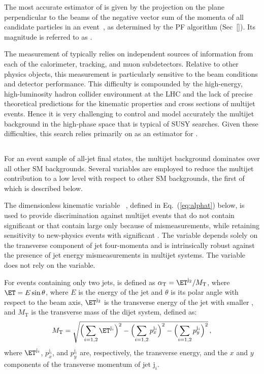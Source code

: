 The most accurate estimator of \ptvecmiss is given by the projection
on the plane perpendicular to the beams of the negative vector sum of
the momenta of all candidate particles in an event~\cite{cms-met}, as
determined by the PF algorithm (Sec~\ref{}). Its magnitude is referred
to as \ETmiss.

The measurement of \met typically relies on independent sources of
information from each of the calorimeter, tracking, and muon
subdetectors. Relative to other physics objects, this measurement is
particularly sensitive to the beam conditions and detector
performance. This difficulty is compounded by the high-energy,
high-luminosity hadron collider environment at the LHC and the lack of
precise theoretical predictions for the kinematic properties and cross
sections of multijet events. Hence it is very challenging to control
and model accurately the multijet background in the high-\met phase
space that is typical of SUSY searches. Given these difficulties, this
search relies primarily on \HTmiss as an estimator for \ptvecmiss. 

\subsection{\alphat}
\label{sec:alphatdef}

For an event sample of all-jet final states, the multijet background
dominates over all other SM backgrounds. Several variables are
employed to reduce the multijet contribution to a low level with
respect to other SM backgrounds, the first of which is described
below. 

The dimensionless kinematic variable \alphat~\cite{Randall:2008rw,
  CMS:2008vya, CMS-PAS-SUS-09-001}, defined in Eq.~(\ref{eq:alphat})
below, is used to provide discrimination against multijet events that
do not contain significant \ptvecmiss or that contain large \ptvecmiss
only because of \pt mismeasurements, while retaining sensitivity to
new-physics events with significant \ptvecmiss. The \alphat variable
depends solely on the transverse component of jet four-momenta and is
intrinsically robust against the presence of jet energy
mismeasurements in multijet systems. The variable does not rely on the
\ETmiss variable.

For events containing only two jets, \alphat is defined as $\alphat =
\ET^{\mathrm{j}_2}/M_\mathrm{T}$, where $\ET= E\sin\theta$, where $E$
is the energy of the jet and $\theta$ is its polar angle with respect
to the beam axis, $\ET^{\mathrm{j}_2}$ is the transverse energy of the
jet with smaller \ET, and $M_\mathrm{T}$ is the transverse mass of the
dijet system, defined as:
\begin{equation}
  \label{eq:mt}
  M_\mathrm{T} = \sqrt{ \Bigl( \sum_{i=1,2} \ET^{\mathrm{j}_i}
    \Bigr)^2 - \Bigl( \sum_{i=1,2} p_x^{\mathrm{j}_i} \Bigr)^2 - \Bigl(
      \sum_{i=1,2} p_y^{\mathrm{j}_i} \Bigr)^2}\, ,
\end{equation}
where $\ET^{\mathrm{j}_i}$, $p_x^{\mathrm{j}_i}$, and
$p_y^{\mathrm{j}_i}$ are, respectively, the transverse energy, and the
$x$ and $y$ components of the transverse momentum of jet
$\mathrm{j}_i$.

